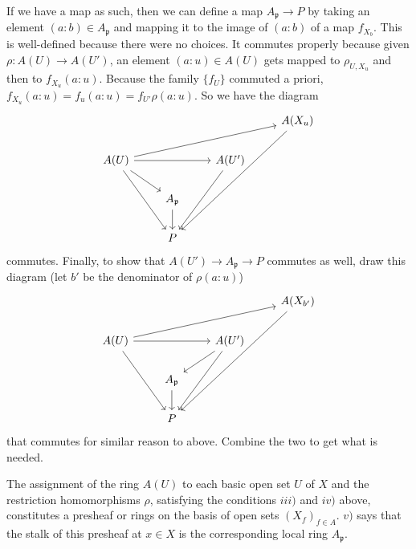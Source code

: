 \documentclass[a4paper]{exam}
\begin{document}
\begin{questions}
\begin{enumerate}
\begin{solution}
	If we have a map as such, then we can define a map $A_{\mathfrak{p}} \to P $ by taking an element $(a:b) \in A_{\mathfrak{p}} $ and mapping it to the image of $(a:b) $ of a map $f_{X_b} $.
	This is well-defined because there were no choices.
	It commutes properly because given $\rho: A(U) \to A(U') $, an element $(a:u) \in A(U) $ gets mapped to $\rho_{U, X_u}$ and then to $f_{X_u}(a:u) $.
	Because the family $\{f_U\}   $ commuted a priori, $f_{X_u}(a:u) = f_u(a:u) = f_{U'}\rho(a:u)$.
	So we have the diagram
	\[
		\begin{tikzcd}
			& & &A(X_u)\\
			A(U) & & A(U')&\\
			     & A_{\mathfrak{p}} &&\\
			     &P&&
		\arrow[from=2-1,to=1-4]
		\arrow[from=2-1,to=2-3]
		\arrow[from=2-1,to=3-2]
		\arrow[from=2-1,to=4-2]
		\arrow[from=1-4,to=4-2]
		\arrow[from=3-2,to=4-2]
		\arrow[from=2-3,to=4-2]
		\end{tikzcd}
	\] 
	commutes.
	Finally, to show that $A(U') \to A_{\mathfrak{p}} \to P $ commutes as well, draw this diagram (let $b' $ be the denominator of $\rho(a:u) $)
	\[
		\begin{tikzcd}
			& & &A(X_{b'})\\
			A(U) & & A(U')&\\
			     & A_{\mathfrak{p}} &&\\
			     &P&&
		\arrow[from=2-1,to=1-4]
		\arrow[from=2-1,to=2-3]
		\arrow[from=2-1,to=4-2]
		\arrow[from=1-4,to=4-2]
		\arrow[from=3-2,to=4-2]
		\arrow[from=2-3,to=4-2]
		\arrow[from=2-3,to=3-2]
		\end{tikzcd}
	\] 
	that commutes for similar reason to above.
	Combine the two to get what is needed.
\end{solution}
The assignment of the ring $A(U) $ to each basic open set $U $ of $X $ and the restriction homomorphisms $\rho $, satisfying the conditions $iii) $ and $iv) $ above, constitutes a presheaf or rings on the basis of open sets $(X_f)_{f\in A} $. $v) $ says that the stalk of this presheaf at $x\in X $ is the corresponding local ring $A_{\mathfrak{p}} $.
\end{enumerate}


\end{questions}
\end{document}
